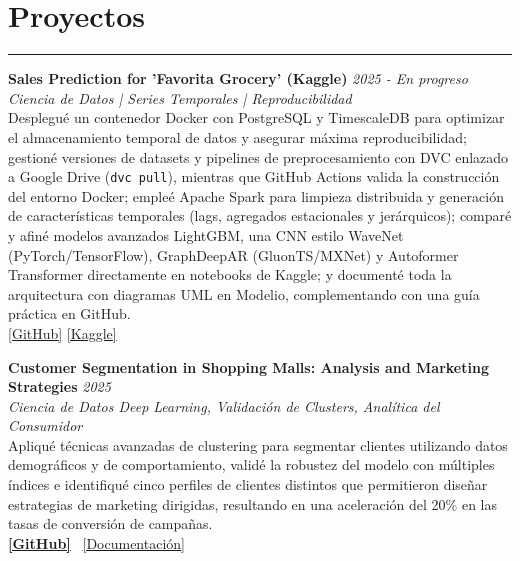 \documentclass[9pt,a4paper]{article}
\begin{document}
\section*{Proyectos}
\vspace{-\baselineskip}

\vspace{-\baselineskip}
\noindent\rule{\linewidth}{0.5pt}
\noindent\textbf{Sales Prediction for 'Favorita Grocery' (Kaggle)} \hfill \textit{2025 - En progreso}\\
\textit{Ciencia de Datos | Series Temporales | Reproducibilidad}\\[1ex]
Desplegué un contenedor Docker con PostgreSQL y TimescaleDB para optimizar el almacenamiento temporal de datos y asegurar máxima reproducibilidad; gestioné versiones de datasets y pipelines de preprocesamiento con DVC enlazado a Google Drive (\texttt{dvc pull}), mientras que GitHub Actions valida la construcción del entorno Docker; empleé Apache Spark para limpieza distribuida y generación de características temporales (lags, agregados estacionales y jerárquicos); comparé y afiné modelos avanzados LightGBM, una CNN estilo WaveNet (PyTorch/TensorFlow), GraphDeepAR (GluonTS/MXNet) y Autoformer Transformer directamente en notebooks de Kaggle; y documenté toda la arquitectura con diagramas UML en Modelio, complementando con una guía práctica en GitHub.\\[1ex]
\noindent\href{https://github.com/Ares-Infenus/Retail_Sales_Trend_Analysis}{[GitHub]} \quad \href{https://www.kaggle.com/c/favorita-grocery-sales-forecasting}{[Kaggle]}

\textbf{Customer Segmentation in Shopping Malls: Analysis and Marketing Strategies} \hfill \textit{2025} \\
\textit{Ciencia de Datos \textbar{} Deep Learning, Validación de Clusters, Analítica del Consumidor} \\
Apliqué técnicas avanzadas de clustering para segmentar clientes utilizando datos demográficos y de comportamiento, validé la robustez del modelo con múltiples índices e identifiqué cinco perfiles de clientes distintos que permitieron diseñar estrategias de marketing dirigidas, resultando en una aceleración del 20\% en las tasas de conversión de campañas. \\
\textbf{\href{https://github.com/Ares-Infenus/Customer-Segmentation-in-Shopping-Malls}{[GitHub]}} \quad\ \href{https://www.linkedin.com/in/sebastiandpinzon/details/projects/1241739216/multiple-media-viewer/?profileId=ACoAAE1Rr-wBOmNQPb8b_Cv0upjAksei7ukFViM&treasuryMediaId=1742855945746}{[Documentación]}
\end{document}

